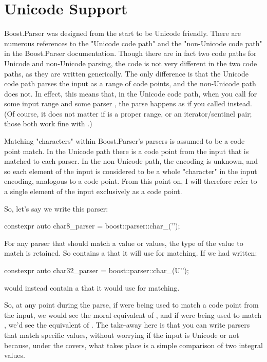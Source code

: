 \documentclass{MyBook}
\begin{document}
\section{Unicode Support}

Boost.Parser was designed from the start to be Unicode friendly. There are numerous references to the "Unicode code path" and the "non-Unicode code path" in the Boost.Parser documentation. Though there are in fact two code paths for Unicode and non-Unicode parsing, the code is not very different in the two code paths, as they are written generically. The only difference is that the Unicode code path parses the input as a range of code points, and the non-Unicode path does not. In effect, this means that, in the Unicode code path, when you call  for some input range  and some parser , the parse happens as if you called  instead. (Of course, it does not matter if  is a proper range, or an iterator/sentinel pair; those both work fine with .)

Matching "characters" within Boost.Parser's parsers is assumed to be a code point match. In the Unicode path there is a code point from the input that is matched to each  parser. In the non-Unicode path, the encoding is unknown, and so each element of the input is considered to be a whole "character" in the input encoding, analogous to a code point. From this point on, I will therefore refer to a single element of the input exclusively as a code point.

So, let's say we write this parser:

\begin{code}
constexpr auto char8_parser = boost::parser::char_('\xcc');
\end{code}

For any  parser that should match a value or values, the type of the value to match is retained. So  contains a  that it will use for matching. If we had written:

\begin{code}
constexpr auto char32_parser = boost::parser::char_(U'\xcc');
\end{code}

 would instead contain a  that it would use for matching.

So, at any point during the parse, if  were being used to match a code point  from the input, we would see the moral equivalent of , and if  were being used to match , we'd see the equivalent of . The take-away here is that you can write  parsers that match specific values, without worrying if the input is Unicode or not because, under the covers, what takes place is a simple comparison of two integral values.
\end{document}
